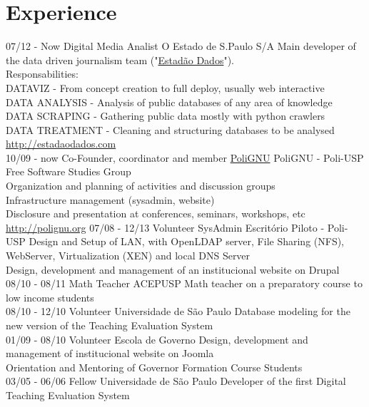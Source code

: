 \documentclass[]{friggeri-cv}
\begin{document}
\section{Experience}
\begin{entrylist}
  \entry
    {07/12 - Now}
    {Digital Media Analist}
    {O Estado de S.Paulo S/A}
    {Main developer of the data driven journalism team ("\href{http://estadaodados.com}{Estadão Dados}").\\
     Responsabilities:\\
     DATAVIZ - From concept creation to full deploy, usually web interactive\\
     DATA ANALYSIS - Analysis of public databases of any area of knowledge\\
     DATA SCRAPING - Gathering public data mostly with python crawlers\\
     DATA TREATMENT - Cleaning and structuring databases to be analysed\\
     \href{http://estadaodados.com}{http://estadaodados.com}\\}
  \entry
    {10/09 - now}
    {Co-Founder, coordinator and member}
    {\href{http://polignu.org}{PoliGNU}}
    {PoliGNU - Poli-USP Free Software Studies Group\\
    Organization and planning of activities and discussion groups\\
     Infrastructure management (sysadmin, website)\\
     Disclosure and presentation at conferences, seminars, workshops, etc\\
     \href{http://polignu.org}{http://polignu.org}}
   \entry
    {07/08 - 12/13}
    {Volunteer SysAdmin}
    {Escritório Piloto - Poli-USP}
    {Design and Setup of LAN, with OpenLDAP server, File Sharing (NFS), WebServer, Virtualization (XEN) and local DNS Server\\
     Design, development and management of an institucional website on Drupal\\}
   \entry
    {08/10 - 08/11}
    {Math Teacher}
    {ACEPUSP}
    {Math teacher on a preparatory course to low income students\\}
   \entry
    {08/10 - 12/10}
    {Volunteer}
    {Universidade de São Paulo}
    {Database modeling for the new version of the Teaching Evaluation System\\}
   \entry
    {01/09 - 08/10}
    {Volunteer}
    {Escola de Governo}
    {Design, development and management of institucional website on Joomla\\
     Orientation and Mentoring of Governor Formation Course Students\\}
   \entry
    {03/05 - 06/06}
    {Fellow}
    {Universidade de São Paulo}
    {Developer of the first Digital Teaching Evaluation System}
\end{entrylist}
\end{document}
